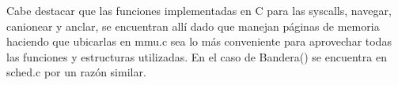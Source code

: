Cabe destacar que las funciones implementadas en C para las syscalls, navegar, canionear y anclar, se encuentran allí dado que manejan p\'aginas
de memoria haciendo que ubicarlas en mmu.c sea lo m\'as conveniente para aprovechar todas las funciones y estructuras utilizadas. En el 
caso de Bandera() se encuentra en sched.c por un raz\'on similar.
